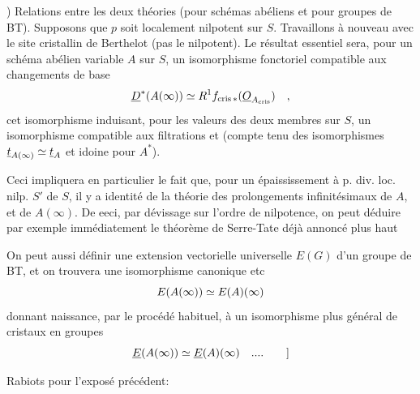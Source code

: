 ) Relations entre les deux théories (pour schémas abéliens et pour
 groupes de BT). Supposons que $p$ soit localement nilpotent sur $S$. Travaillons  à nouveau avec le site cristallin de Berthelot (pas le
nilpotent). Le résultat essentiel sera, pour un schéma abélien variable\deleted{\unsure{,}}
$A$ sur $S$, un isomorphisme fonctoriel compatible aux changements de base
\[
\underline D^{*}(A(\infty))\simeq R^{1}f_{\mathrm{cris}\,*}(\underline O_{A_{\mathrm{cris}}})\quad ,
\]
cet isomorphisme induisant, pour les valeurs des deux membres sur $S$, un
isomorphisme compatible aux filtrations \qquad et \qquad (compte tenu des
isomorphismes $\underline t_{A(\infty)}\simeq\underline t_A$ et idoine pour $A^{*}$).

Ceci impliquera en particulier le fait que, pour un  épaississement à p. div. loc. nilp.  $S'$ de $S$, il y a identité de la théorie
des prolongements infinitésimaux de $A$, et de $A(\infty)$. De eeci, par dévissage
sur l'ordre de nilpotence, on peut déduire par exemple immédiatement le
théorème de Serre-Tate déjà annoncé plus haut\handwritten{:}

\handwritten{[}On peut aussi définir une extension vectorielle universelle  $E(G)$
d'un groupe de BT, et on trouvera une isomorphisme canonique etc
\[
E(A(\infty))\simeq E(A)(\infty)
\]
donnant naissance, par le procédé habituel, à un isomorphisme plus
général de cristaux en groupes
\[
\underline E(A(\infty))\simeq\underline E(A)(\infty)\quad....\qquad]
\]



Rabiots pour l'exposé précédent:


